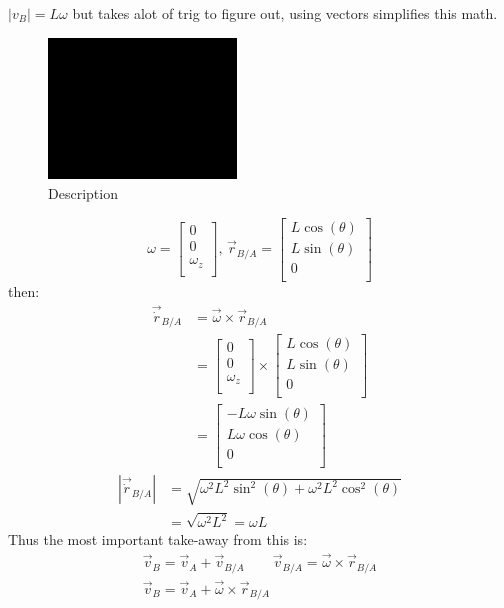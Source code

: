 \documentclass[11pt, a4paper]{article}
\begin{document}
$|v_B|=L\omega$ but takes alot of trig to figure out, using vectors simplifies this math.
\begin{figure}[h]
  \centerline{\includegraphics[width=50mm]{images/placeholder.png}}
  \caption{Description}
\end{figure}
\begin{equation}
  \omega = \begin{bmatrix} 0\\ 0\\ \omega_z\\ \end{bmatrix},\, \vec{r}_{B/A} = \begin{bmatrix} L\cos(\theta)\\ L\sin(\theta)\\ 0\\ \end{bmatrix}
\end{equation}
then:
\begin{align}
  \vec{\dot{r}}_{B/A} &= \vec{\omega} \times \vec{r}_{B/A}\\
                      &=  \begin{bmatrix} 0\\ 0\\ \omega_z\\ \end{bmatrix} \times \begin{bmatrix} L\cos  (\theta)\\ L\sin(\theta)\\ 0\\ \end{bmatrix}\\
                      &=  \begin{bmatrix} -L\omega \sin(\theta)\\ L\omega \cos(\theta)\\ 0\\ \end{bmatrix} 
\end{align}
\begin{align}
  |\vec{\dot{r}}_{B/A}| &= \sqrt{\omega^2L^2\sin^2(\theta) + \omega^2L^2\cos^2(\theta)}\\
                        &= \sqrt{\omega^2L^2} = \omega L
\end{align}
Thus the most important take-away from this is:
\begin{gather}
  \vec{v}_B = \vec{v}_A + \vec{v}_{B/A} \qquad \vec{v}_{B/A} = \vec{\omega} \times \vec{r}_{B/A}\\
  \vec{v}_B = \vec{v}_A + \vec{\omega} \times \vec{r}_{B/A}
\end{gather}
\end{document}
